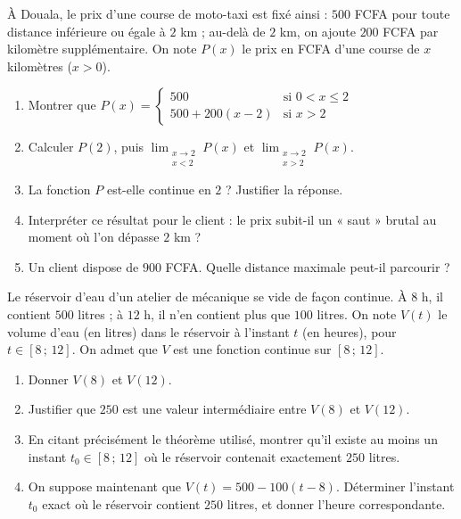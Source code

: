 \documentclass[11pt]{article}
\begin{document}
\begin{exercice}
À Douala, le prix d'une course de moto-taxi est fixé ainsi : $500$ FCFA pour toute distance inférieure ou égale à $2$ km ; au-delà de $2$ km, on ajoute $200$ FCFA par kilomètre supplémentaire. On note $P(x)$ le prix en FCFA d'une course de $x$ kilomètres ($x > 0$).
\begin{enumerate}
\item Montrer que $P(x) = \begin{cases} 500 & \text{si } 0 < x \leq 2 \\ 500 + 200(x-2) & \text{si } x > 2 \end{cases}$
\item Calculer $P(2)$, puis $\displaystyle\lim_{\substack{x \to 2 \\ x < 2}} P(x)$ et $\displaystyle\lim_{\substack{x \to 2 \\ x > 2}} P(x)$.
\item La fonction $P$ est-elle continue en $2$ ? Justifier la réponse.
\item Interpréter ce résultat pour le client : le prix subit-il un « saut » brutal au moment où l'on dépasse $2$ km ?
\item Un client dispose de $900$ FCFA. Quelle distance maximale peut-il parcourir ?
\end{enumerate}
\end{exercice}

\begin{exercice}
Le réservoir d'eau d'un atelier de mécanique se vide de façon continue. À $8$ h, il contient $500$ litres ; à $12$ h, il n'en contient plus que $100$ litres. On note $V(t)$ le volume d'eau (en litres) dans le réservoir à l'instant $t$ (en heures), pour $t \in [8\,;\,12]$. On admet que $V$ est une fonction continue sur $[8\,;\,12]$.
\begin{enumerate}
\item Donner $V(8)$ et $V(12)$.
\item Justifier que $250$ est une valeur intermédiaire entre $V(8)$ et $V(12)$.
\item En citant précisément le théorème utilisé, montrer qu'il existe au moins un instant $t_0 \in [8\,;\,12]$ où le réservoir contenait exactement $250$ litres.
\item On suppose maintenant que $V(t) = 500 - 100(t-8)$. Déterminer l'instant $t_0$ exact où le réservoir contient $250$ litres, et donner l'heure correspondante.
\end{enumerate}
\end{exercice}
\end{document}
